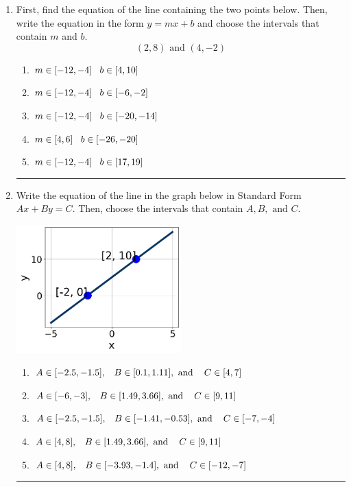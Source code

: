 \documentclass[14pt]{extbook}
\newcommand{\litem}[1]{\item#1\hspace*{-1cm}\rule{\textwidth}{0.4pt}}
\begin{document}
\begin{enumerate}
{\begin{enumerate}[label=\Alph*.]
\end{enumerate} }
\litem{
First, find the equation of the line containing the two points below. Then, write the equation in the form $ y=mx+b $ and choose the intervals that contain $m$ and $b$.\[ (2, 8) \text{ and } (4, -2) \]\begin{enumerate}[label=\Alph*.]
\item \( m \in [-12, -4] \hspace*{3mm} b \in [4, 10] \)
\item \( m \in [-12, -4] \hspace*{3mm} b \in [-6, -2] \)
\item \( m \in [-12, -4] \hspace*{3mm} b \in [-20, -14] \)
\item \( m \in [4, 6] \hspace*{3mm} b \in [-26, -20] \)
\item \( m \in [-12, -4] \hspace*{3mm} b \in [17, 19] \)

\end{enumerate} }
\litem{
Write the equation of the line in the graph below in Standard Form $Ax+By=C$. Then, choose the intervals that contain $A, B, \text{ and } C$.
\begin{center}
    \includegraphics[width=0.5\textwidth]{../Figures/linearGraphToStandardCopyC.png}
\end{center}
\begin{enumerate}[label=\Alph*.]
\item \( A \in [-2.5, -1.5], \hspace{3mm} B \in [0.1, 1.11], \text{ and } \hspace{3mm} C \in [4, 7] \)
\item \( A \in [-6, -3], \hspace{3mm} B \in [1.49, 3.66], \text{ and } \hspace{3mm} C \in [9, 11] \)
\item \( A \in [-2.5, -1.5], \hspace{3mm} B \in [-1.41, -0.53], \text{ and } \hspace{3mm} C \in [-7, -4] \)
\item \( A \in [4, 8], \hspace{3mm} B \in [1.49, 3.66], \text{ and } \hspace{3mm} C \in [9, 11] \)
\item \( A \in [4, 8], \hspace{3mm} B \in [-3.93, -1.4], \text{ and } \hspace{3mm} C \in [-12, -7] \)


\end{enumerate}}
\end{enumerate}
\end{document}
